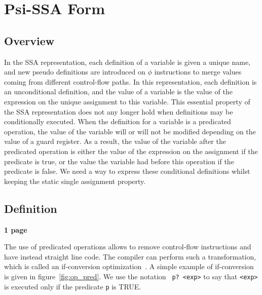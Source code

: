 \chapter{Psi-SSA Form }

\section{Overview}



In the SSA representation, each definition of a variable is given a
unique name, and new pseudo definitions are introduced on $\phi$
instructions to merge values coming from different control-flow
paths. In this representation, each definition is an unconditional
definition, and the value of a variable is the value of the expression
on the unique assignment to this variable. This essential property of
the SSA representation does not any longer hold when definitions may
be conditionally executed. When the definition for a variable is a
predicated operation, the value of the variable will or will not be
modified depending on the value of a guard register. As a result, the
value of the variable after the predicated operation is either the
value of the expression on the assignment if the predicate is true, or
the value the variable had before this operation if the predicate is
false. We need a way to express these conditional definitions whilst
keeping the static single assignment property.

\section{Definition}

\textbf{1 page}


The use of predicated operations allows to remove control-flow
instructions and have instead straight line code. The compiler can
perform such a transformation, which is called an if-conversion
optimization~\cite{Fang96, Bru06}. A simple example of if-conversion
is given in figure~\ref{fig:op_pred}. We use the notation {\tt
  p?~<exp>} to say that {\tt <exp>} is executed only if the predicate
{\tt p} is TRUE.


